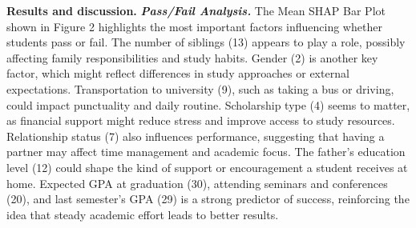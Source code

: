 \begin{multicols}{2}
{\bfseries Results and discussion.} \emph{{\bfseries Pass/Fail Analysis.}} The
Mean SHAP Bar Plot shown in Figure 2 highlights the most important
factors influencing whether students pass or fail. The number of
siblings (13) appears to play a role, possibly affecting family
responsibilities and study habits. Gender (2) is another key factor,
which might reflect differences in study approaches or external
expectations. Transportation to university (9), such as taking a bus or
driving, could impact punctuality and daily routine. Scholarship type
(4) seems to matter, as financial support might reduce stress and
improve access to study resources. Relationship status (7) also
influences performance, suggesting that having a partner may affect time
management and academic focus. The father's education level (12) could
shape the kind of support or encouragement a student receives at home.
Expected GPA at graduation (30), attending seminars and conferences
(20), and last semester's GPA (29) is a strong predictor of success,
reinforcing the idea that steady academic effort leads to better
results.
\end{multicols}

